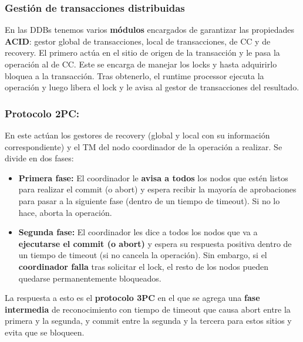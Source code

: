 \subsubsection*{Gestión de transacciones distribuidas}
En las DDBs tenemos varios \textbf{módulos} encargados de garantizar las propiedades \textbf{ACID}: gestor global de transacciones, local de transacciones, de CC y de recovery. El primero actúa en el sitio de origen de la transacción y le pasa la operación al de CC. Este se encarga de manejar los locks y hasta adquirirlo bloquea a la transacción. Tras obtenerlo, el runtime processor ejecuta la operación y luego libera el lock y le avisa al gestor de transacciones del resultado.

\subsubsection*{Protocolo 2PC:}
En este actúan los gestores de recovery (global y local con su información correspondiente) y el TM del nodo coordinador de la operación a realizar. Se divide en dos fases:
\begin{itemize}
    \item \textbf{Primera fase:} El coordinador le \textbf{avisa a todos} los nodos que estén listos para realizar el commit (o abort) y espera recibir la mayoría de aprobaciones para pasar a la siguiente fase (dentro de un tiempo de timeout). Si no lo hace, aborta la operación.
    \item \textbf{Segunda fase:} El coordinador les dice a todos los nodos que va a \textbf{ejecutarse el commit (o abort)} y espera su respuesta positiva dentro de un tiempo de timeout (si no cancela la operación). Sin embargo, si el \textbf{coordinador falla} tras solicitar el lock, el resto de los nodos pueden quedarse permanentemente bloqueados.
\end{itemize}
La respuesta a esto es el \textbf{protocolo 3PC} en el que se agrega una \textbf{fase intermedia} de reconocimiento con tiempo de timeout que causa abort entre la primera y la segunda, y commit entre la segunda y la tercera para estos sitios y evita que se bloqueen.

